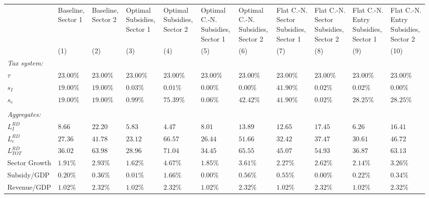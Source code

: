 \begin{tabular}{lC{2.3cm}C{2.3cm}C{2.3cm}C{2.3cm}C{2.3cm}C{2.3cm}C{2.3cm}C{2.3cm}C{2.3cm}C{2.3cm}}
& Baseline, Sector 1 & Baseline, Sector 2 & Optimal Subsidies, Sector 1 & Optimal Subsidies, Sector 2 & Optimal C.-N. Subsidies, Sector 1 & Optimal C.-N. Subsidies, Sector 2 & Flat C.-N. Sector Subsidies, Sector 1 & Flat C.-N. Sector Subsidies, Sector 2 & Flat C.-N. Entry Subsidies, Sector 1 & Flat C.-N. Entry Subsidies, Sector 2 \\ 
&(1)&(2)&(3)&(4)&(5)&(6)&(7)&(8)&(9)&(10)\\ \midrule 
\textsl{Tax system:} \\ 
$\tau$ & $23.00\%$ & $23.00\%$ & $23.00\%$ & $23.00\%$ & $23.00\%$ & $23.00\%$ & $23.00\%$ & $23.00\%$ & $23.00\%$ & $23.00\%$ \\ 
$s_{I}$ & $19.00\%$ & $19.00\%$ & $0.03\%$ & $0.01\%$ & $0.00\%$ & $0.00\%$ & $41.90\%$ & $0.02\%$ & $0.02\%$ & $0.00\%$ \\ 
$s_e$ & $19.00\%$ & $19.00\%$ & $0.99\%$ & $75.39\%$ & $0.06\%$ & $42.42\%$ & $41.90\%$ & $0.02\%$ & $28.25\%$ & $28.25\%$ \\ 
\\[-.2cm]
\textsl{Aggregates:}\\ 
$L^{RD}_{I}$ & $8.66$ & $22.20$ & $5.83$ & $4.47$ & $8.01$ & $13.89$ & $12.65$ & $17.45$ & $6.26$ & $16.41$ \\ 
$L^{RD}_{e}$ & $27.36$ & $41.78$ & $23.12$ & $66.57$ & $26.44$ & $51.66$ & $32.42$ & $37.47$ & $30.61$ & $46.72$ \\ 
$L^{RD}_{TOT}$ & $36.02$ & $63.98$ & $28.96$ & $71.04$ & $34.45$ & $65.55$ & $45.07$ & $54.93$ & $36.87$ & $63.13$ \\ 
Sector Growth & $1.91\%$ & $2.93\%$ & $1.62\%$ & $4.67\%$ & $1.85\%$ & $3.61\%$ & $2.27\%$ & $2.62\%$ & $2.14\%$ & $3.26\%$ \\ 
Subsidy/GDP & $0.20\%$ & $0.36\%$ & $0.01\%$ & $1.66\%$ & $0.00\%$ & $0.56\%$ & $0.55\%$ & $0.00\%$ & $0.22\%$ & $0.34\%$ \\ 
Revenue/GDP & $1.02\%$ & $2.32\%$ & $1.02\%$ & $2.32\%$ & $1.02\%$ & $2.32\%$ & $1.02\%$ & $2.32\%$ & $1.02\%$ & $2.32\%$ \\ 
\bottomrule 
\end{tabular}